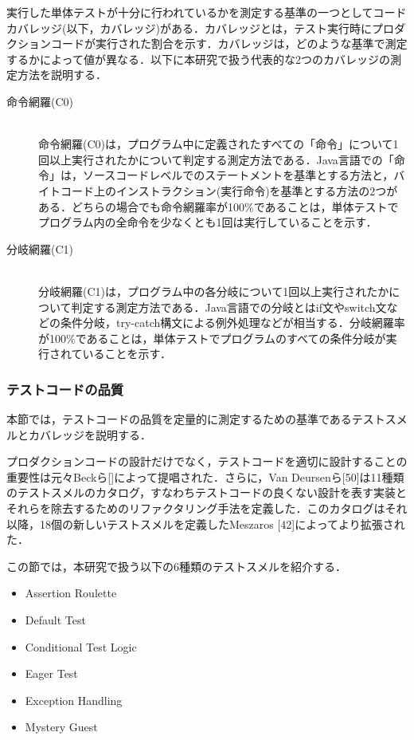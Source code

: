 \documentclass[12pt]{jarticle} %
\begin{document}
実行した単体テストが十分に行われているかを測定する基準の一つとしてコードカバレッジ(以下，カバレッジ)がある．カバレッジとは，テスト実行時にプロダクションコードが実行された割合を示す．カバレッジは，どのような基準で測定するかによって値が異なる．以下に本研究で扱う代表的な2つのカバレッジの測定方法を説明する．

\begin{description}
\item[命令網羅(C0)]~\\
命令網羅(C0)は，プログラム中に定義されたすべての「命令」について1回以上実行されたかについて判定する測定方法である．Java言語での「命令」は，ソースコードレベルでのステートメントを基準とする方法と，バイトコード上のインストラクション(実行命令)を基準とする方法の2つがある．どちらの場合でも命令網羅率が100\%であることは，単体テストでプログラム内の全命令を少なくとも1回は実行していることを示す．
\item[分岐網羅(C1)]~\\
分岐網羅(C1)は，プログラム中の各分岐について1回以上実行されたかについて判定する測定方法である．Java言語での分岐とはif文やswitch文などの条件分岐，try-catch構文による例外処理などが相当する．分岐網羅率が100\%であることは，単体テストでプログラムのすべての条件分岐が実行されていることを示す．
\end{description}




\subsubsection{テストコードの品質}

本節では，テストコードの品質を定量的に測定するための基準であるテストスメルとカバレッジを説明する．

プロダクションコードの設計だけでなく，テストコードを適切に設計することの重要性は元々Beckら[]によって提唱された．さらに，Van Deursenら[50]は11種類のテストスメルのカタログ，すなわちテストコードの良くない設計を表す実装とそれらを除去するためのリファクタリング手法を定義した．このカタログはそれ以降，18個の新しいテストスメルを定義したMeszaros [42]によってより拡張された．

この節では，本研究で扱う以下の6種類のテストスメルを紹介する．

\begin{itemize}
\item Assertion Roulette
\item Default Test
\item Conditional Test Logic
\item Eager Test
\item Exception Handling
\item Mystery Guest
\end{itemize}
\end{document}

